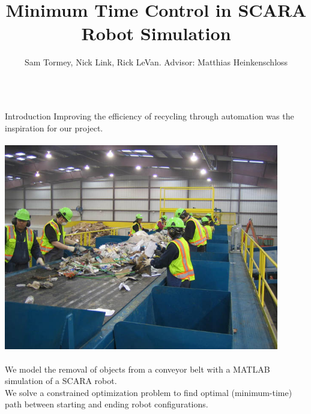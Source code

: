 \documentclass[final]{beamer}
\title[Fancy Posters]{Minimum Time Control in SCARA Robot Simulation}
\author{Sam Tormey, Nick Link, Rick LeVan. Advisor: Matthias Heinkenschloss}
\institute{Department of Computational and Applied Mathematics, Rice University}
\begin{document}
        \begin{frame}{}
        
        \vfill
        \vspace{-1cm}
{\footnotesize
\begin{columns}[t]
        
\hspace{0.7cm}
\begin{column}{.30\linewidth}
                
\begin{block}{\centering Introduction}
Improving the efficiency of recycling through automation was the inspiration for our project.    \\

\centering \includegraphics[height=10cm, width = 12cm]{figures/mrf-recycling-system.jpg}\\

We model the removal of objects from a conveyor belt with a MATLAB simulation of a SCARA robot.\\

We solve a constrained optimization problem to find optimal (minimum-time) path between starting and
ending robot configurations. \\
 
\end{block}
                

\end{column}
\end{columns}}
\end{frame}
\end{document}
